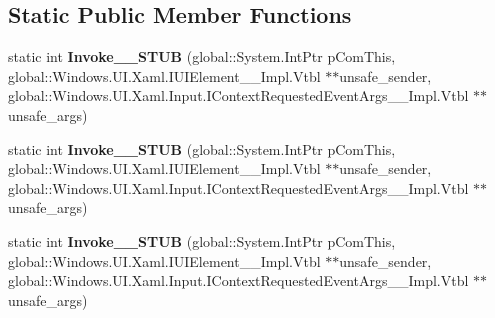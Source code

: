 \subsection*{Static Public Member Functions}
\begin{DoxyCompactItemize}
\item 
\mbox{\label{struct_windows_1_1_foundation_1_1_typed_event_handler___a___windows___u_i___xaml___u_i_element__da1bc19a586bc8852d547ddd669460cf_a32b74f1f5e4eb60f0bbbb45b12d14e67}} 
static int {\bfseries Invoke\+\_\+\+\_\+\+S\+T\+UB} (global\+::\+System.\+Int\+Ptr p\+Com\+This, global\+::\+Windows.\+U\+I.\+Xaml.\+I\+U\+I\+Element\+\_\+\+\_\+\+Impl.\+Vtbl $\ast$$\ast$unsafe\+\_\+sender, global\+::\+Windows.\+U\+I.\+Xaml.\+Input.\+I\+Context\+Requested\+Event\+Args\+\_\+\+\_\+\+Impl.\+Vtbl $\ast$$\ast$unsafe\+\_\+args)
\item 
\mbox{\label{struct_windows_1_1_foundation_1_1_typed_event_handler___a___windows___u_i___xaml___u_i_element__da1bc19a586bc8852d547ddd669460cf_a32b74f1f5e4eb60f0bbbb45b12d14e67}} 
static int {\bfseries Invoke\+\_\+\+\_\+\+S\+T\+UB} (global\+::\+System.\+Int\+Ptr p\+Com\+This, global\+::\+Windows.\+U\+I.\+Xaml.\+I\+U\+I\+Element\+\_\+\+\_\+\+Impl.\+Vtbl $\ast$$\ast$unsafe\+\_\+sender, global\+::\+Windows.\+U\+I.\+Xaml.\+Input.\+I\+Context\+Requested\+Event\+Args\+\_\+\+\_\+\+Impl.\+Vtbl $\ast$$\ast$unsafe\+\_\+args)
\item 
\mbox{\label{struct_windows_1_1_foundation_1_1_typed_event_handler___a___windows___u_i___xaml___u_i_element__da1bc19a586bc8852d547ddd669460cf_a32b74f1f5e4eb60f0bbbb45b12d14e67}} 
static int {\bfseries Invoke\+\_\+\+\_\+\+S\+T\+UB} (global\+::\+System.\+Int\+Ptr p\+Com\+This, global\+::\+Windows.\+U\+I.\+Xaml.\+I\+U\+I\+Element\+\_\+\+\_\+\+Impl.\+Vtbl $\ast$$\ast$unsafe\+\_\+sender, global\+::\+Windows.\+U\+I.\+Xaml.\+Input.\+I\+Context\+Requested\+Event\+Args\+\_\+\+\_\+\+Impl.\+Vtbl $\ast$$\ast$unsafe\+\_\+args)
\item 
\mbox{\label{struct_windows_1_1_foundation_1_1_typed_event_handler___a___windows___u_i___xaml___u_i_element__da1bc19a586bc8852d547ddd669460cf_a32b74f1f5e4eb60f0bbbb45b12d14e67}} 

\end{DoxyCompactItemize}
